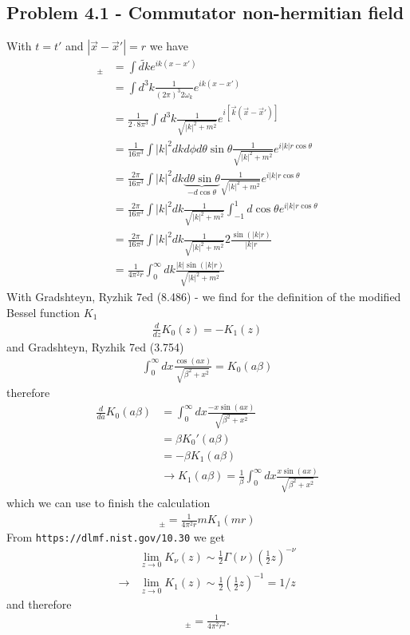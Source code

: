\documentclass[../main.tex]{subfiles}
\begin{document}
\subsection{Problem 4.1 - Commutator non-hermitian field}
With $t=t'$ and $|\vec{x}-\vec{x}'|=r$ we have 
\begin{align}
[\varphi^+(x),\varphi^-(x')]_\pm
&=\int\widetilde{dk}e^{ik(x-x')}\\
&=\int d^3k\frac{1}{(2\pi)^3 2\omega_k}e^{ik(x-x')}\\
&=\frac{1}{2\cdot8\pi^3}\int d^3k\frac{1}{\sqrt{|k|^2+m^2}}e^{i[\vec{k}(\vec{x}-\vec{x}')]}\\
&=\frac{1}{16\pi^3}\int |k|^2dkd\phi d\theta\sin\theta\frac{1}{\sqrt{|k|^2+m^2}}e^{i|k|r\cos\theta}\\
&=\frac{2\pi}{16\pi^3}\int |k|^2dk \underbrace{d\theta\sin\theta}_{-d\cos\theta}\frac{1}{\sqrt{|k|^2+m^2}}e^{i|k|r\cos\theta}\\
&=\frac{2\pi}{16\pi^3}\int |k|^2dk \frac{1}{\sqrt{|k|^2+m^2}}\int_{-1}^1d\cos\theta e^{i|k|r\cos\theta}\\
&=\frac{2\pi}{16\pi^3}\int |k|^2dk \frac{1}{\sqrt{|k|^2+m^2}}2\frac{\sin(|k|r)}{|k|r}\\
&=\frac{1}{4\pi^2r}\int_0^\infty dk \frac{|k|\sin(|k|r)}{\sqrt{|k|^2+m^2}}
\end{align}
With Gradshteyn, Ryzhik 7ed (8.486) - we find for the definition of the modified Bessel function $K_1$ 
\begin{align}
\frac{d}{dz}K_0(z)=-K_1(z)
\end{align}
and Gradshteyn, Ryzhik 7ed (3.754)
\begin{align}
\int_0^\infty dx \frac{\cos(ax)}{\sqrt{\beta^2+x^2}}=K_0(a\beta)
\end{align}
therefore
\begin{align}
\frac{d}{da}K_0(a\beta)&=\int_0^\infty dx \frac{-x\sin(ax)}{\sqrt{\beta^2+x^2}}\\
&=\beta K_0'(a\beta)\\
&=-\beta K_1(a\beta)\\
&\rightarrow K_1(a\beta)=\frac{1}{\beta}\int_0^\infty dx \frac{x\sin(ax)}{\sqrt{\beta^2+x^2}}
\end{align}
which we can use to finish the calculation
\begin{align}
[\varphi^+(x),\varphi^-(x')]_\pm=\frac{1}{4\pi^2r}mK_1(mr)
\end{align}
From \texttt{https://dlmf.nist.gov/10.30} we get
\begin{align}
&\lim_{z\rightarrow0}K_\nu(z)\sim\frac{1}{2}\Gamma(\nu)\left(\frac{1}{2}z\right)^{-\nu}\\
\rightarrow&\lim_{z\rightarrow0}K_1(z)\sim\frac{1}{2}\left(\frac{1}{2}z\right)^{-1}=1/z
\end{align}
and therefore
\begin{align}
[\varphi^+(x),\varphi^-(x')]_\pm=\frac{1}{4\pi^2r^2}.
\end{align}
\end{document}
